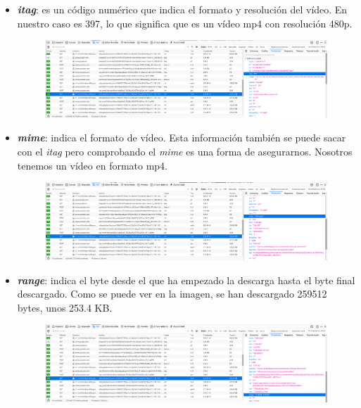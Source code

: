 \documentclass[11pt,a4paper]{article}
\begin{document}
\begin{itemize}
	\item \textbf{\textit{itag}}: es un código numérico que indica el formato y resolución del vídeo. En nuestro caso es 397, lo que significa que es un vídeo mp4 con resolución 480p.
	
	\begin{figure}[H]
		\centering
		\includegraphics[scale=0.22]{img/itag.png}
	\end{figure}		
	
	\item \textbf{\textit{mime}}: indica el formato de vídeo. Esta información también se puede sacar con el \textit{itag} pero comprobando el \textit{mime} es una forma de asegurarnos. Nosotros tenemos un vídeo en formato mp4.
	
	\begin{figure}[H]
		\centering
		\includegraphics[scale=0.22]{img/mime.png}
	\end{figure}
	
	\item \textbf{\textit{range}}: indica el byte desde el que ha empezado la descarga hasta el byte final descargado. Como se puede ver en la imagen, se han descargado 259512 bytes, unos 253.4 KB.
	
	\begin{figure}[H]
		\centering
		\includegraphics[scale=0.22]{img/range.png}
	\end{figure}		
	
\end{itemize}
\end{document}
